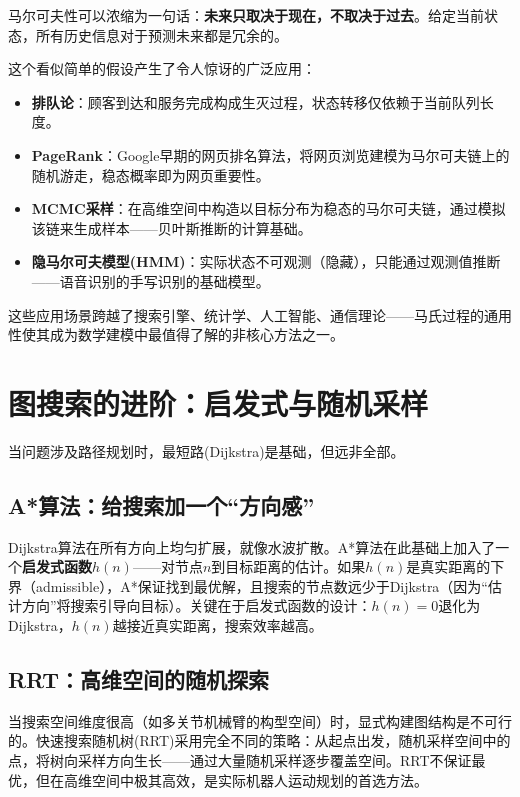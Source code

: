 \documentclass[12pt,a4paper]{ctexart}
\begin{document}
马尔可夫性可以浓缩为一句话：\textbf{未来只取决于现在，不取决于过去}。给定当前状态，所有历史信息对于预测未来都是冗余的。

这个看似简单的假设产生了令人惊讶的广泛应用：
\begin{itemize}[nosep]
    \item \textbf{排队论}：顾客到达和服务完成构成生灭过程，状态转移仅依赖于当前队列长度。
    \item \textbf{PageRank}：Google早期的网页排名算法，将网页浏览建模为马尔可夫链上的随机游走，稳态概率即为网页重要性。
    \item \textbf{MCMC采样}：在高维空间中构造以目标分布为稳态的马尔可夫链，通过模拟该链来生成样本——贝叶斯推断的计算基础。
    \item \textbf{隐马尔可夫模型(HMM)}：实际状态不可观测（隐藏），只能通过观测值推断——语音识别的手写识别的基础模型。
\end{itemize}

这些应用场景跨越了搜索引擎、统计学、人工智能、通信理论——马氏过程的通用性使其成为数学建模中最值得了解的非核心方法之一。

\section{图搜索的进阶：启发式与随机采样}

当问题涉及路径规划时，最短路(Dijkstra)是基础，但远非全部。

\subsection{A*算法：给搜索加一个``方向感''}

Dijkstra算法在所有方向上均匀扩展，就像水波扩散。A*算法在此基础上加入了一个\textbf{启发式函数}$h(n)$——对节点$n$到目标距离的估计。如果$h(n)$是真实距离的下界（admissible），A*保证找到最优解，且搜索的节点数远少于Dijkstra（因为``估计方向''将搜索引导向目标）。关键在于启发式函数的设计：$h(n)=0$退化为Dijkstra，$h(n)$越接近真实距离，搜索效率越高。

\subsection{RRT：高维空间的随机探索}

当搜索空间维度很高（如多关节机械臂的构型空间）时，显式构建图结构是不可行的。快速搜索随机树(RRT)采用完全不同的策略：从起点出发，随机采样空间中的点，将树向采样方向生长——通过大量随机采样逐步覆盖空间。RRT不保证最优，但在高维空间中极其高效，是实际机器人运动规划的首选方法。
\end{document}
